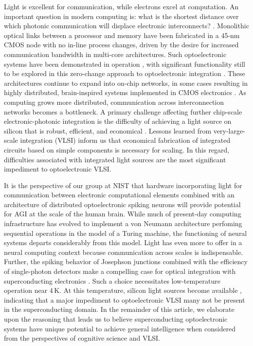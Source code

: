 \documentclass[twocolumn]{article}
\begin{document}
Light is excellent for communication, while electrons excel at computation. An important question in modern computing is: what is the shortest distance over which photonic communication will displace electronic interconnects? \cite{mi2017}. Monolithic optical links between a processor and memory have been fabricated in a 45-nm CMOS node with no in-line process changes, driven by the desire for increased communication bandwidth in multi-core architectures. Such optoelectronic systems have been demonstrated in operation \cite{suwa2015}, with significant functionality still to be explored in this zero-change approach to optoelectronic integration \cite{stra2018}. These architectures continue to expand into on-chip networks, in some cases resulting in highly distributed, brain-inspired systems implemented in CMOS electronics \cite{bo2000,pfgr2013,mear2014,fuga2014,payu2017,dasr2018}. As computing grows more distributed, communication across interconnection networks becomes a bottleneck. A primary challenge affecting further chip-scale electronic-photonic integration is the difficulty of achieving a light source on silicon that is robust, efficient, and economical \cite{libo2010,zhyi2015}. Lessons learned from very-large-scale integration (VLSI) inform us that economical fabrication of integrated circuits based on simple components is necessary for scaling. In this regard, difficulties associated with integrated light sources are the most significant impediment to optoelectronic VLSI.

It is the perspective of our group at NIST that hardware incorporating light for communication between electronic computational elements combined with an architecture of distributed optoelectronic spiking neurons will provide potential for AGI at the scale of the human brain. While much of present-day computing infrastructure has evolved to implement a von Neumann architecture perfoming sequential operations in the model of a Turing machine, the functioning of neural systems departs considerably from this model. Light has even more to offer in a neural computing context because communication across scales is indispensable. Further, the spiking behavior of Josephson junctions combined with the efficiency of single-photon detectors make a compelling case for optical integration with superconducting electronics \cite{shbu2017,sh2018}. Such a choice necessitates low-temperature operation near 4\,K. At this temperature, silicon light sources become available \cite{buch2017}, indicating that a major impediment to optoelectronic VLSI many not be present in the superconducting domain. In the remainder of this article, we elaborate upon the reasoning that leads us to believe superconducting optoelectronic systems have unique potential to achieve general intelligence when considered from the perspectives of cognitive science and VLSI.
\end{document}
